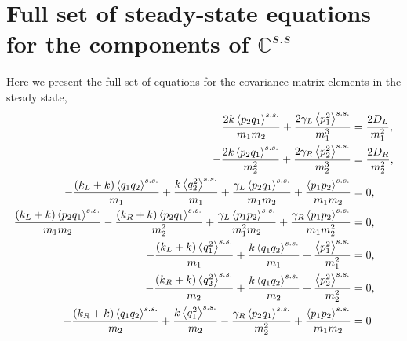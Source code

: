 \appendix




\section{Full set of steady-state equations for the components of $\mathbb{C}^{s.s}$  \label{AppStationaryStateEquations}}
Here we present the full set of equations for the covariance matrix elements in the steady state,
%
\begin{equation}
  \begin{split}
    \frac{2 k \expval{ p_2 q_1}^{s.s.} }{m_1 m_2}+\frac{2 \gamma _L \expval{ p_1^2}^{s.s.} }{m_1^3}&=\frac{2 D_L}{m_1^2},
    \\
    -\frac{2 k \expval{ p_2 q_1}^{s.s.} }{m_2^2}+\frac{2 \gamma _R \expval{ p_2^2}^{s.s.} }{m_2^3}&=\frac{2 D_R}{m_2^2},
    \\
    -\frac{\left(k_L+k\right) \expval{ q_1 q_2}^{s.s.} }{m_1}+\frac{k \expval{ q_2^2}^{s.s.} }{m_1}+\frac{\gamma _L \expval{ p_2 q_1}^{s.s.} }{m_1 m_2}+\frac{\expval{ p_1 p_2}^{s.s.} }{m_1 m_2}&=0,
    \\
    \frac{\left(k_L+k\right) \expval{ p_2 q_1}^{s.s.} }{m_1 m_2}-\frac{\left(k_R+k\right) \expval{ p_2 q_1}^{s.s.} }{m_2^2}+\frac{\gamma _L \expval{ p_1 p_2}^{s.s.} }{m_1^2 m_2}+\frac{\gamma _R \expval{ p_1 p_2}^{s.s.} }{m_1 m_2^2}&=0,
    \\
    -\frac{\left(k_L+k\right) \expval{ q_1^2}^{s.s.} }{m_1}+\frac{k \expval{ q_1 q_2}^{s.s.} }{m_1}+\frac{\expval{ p_1^2}^{s.s.} }{m_1^2}&=0,
    \\
    -\frac{\left(k_R+k\right) \expval{ q_2^2}^{s.s.} }{m_2}+\frac{k \expval{ q_1 q_2}^{s.s.} }{m_2}+\frac{\expval{ p_2^2}^{s.s.} }{m_2^2}&=0,
    \\
    -\frac{\left(k_R+k\right) \expval{ q_1 q_2}^{s.s.} }{m_2}+\frac{k \expval{ q_1^2}^{s.s.} }{m_2}-\frac{\gamma _R \expval{ p_2 q_1}^{s.s.} }{m_2^2}+\frac{\expval{ p_1 p_2}^{s.s.} }{m_1 m_2}&=0
  \end{split}
  \label{eq:SteadyStateEquationsModelB_Explicite}
\end{equation}

%
%
